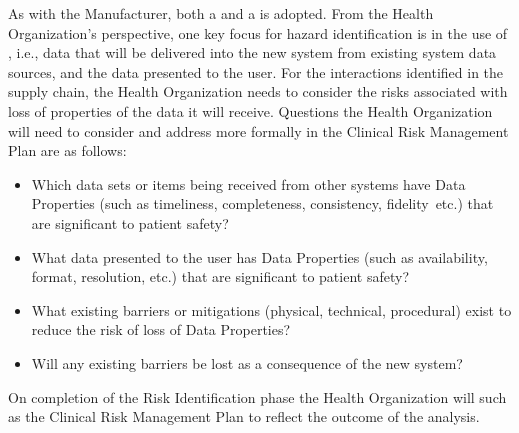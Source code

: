 As with the Manufacturer, both a  and a  is adopted. From the Health Organization's perspective, one key focus for hazard identification is in the use of , i.e., data that will be delivered into the new system from existing system data sources, and the data presented to the user. For the interactions identified in the supply chain, the Health Organization needs to consider the risks associated with loss of properties of the data it will receive. Questions the Health Organization will need to consider and address more formally in the Clinical Risk Management Plan are as follows:
\clearpage%
\begin{itemize}
  \item Which data sets or items being received from other systems have Data Properties (such as timeliness, \gls{completeness}, \gls{consistency}, \cbstart\gls{fidelity}\cbend\ etc.) that are significant to patient safety? 
  \item What data presented to the user has Data Properties (such as \gls{availability}, format, resolution, etc.) that are significant to patient safety?
  \item What existing barriers or mitigations (physical, technical, procedural) exist to reduce the risk of loss of Data Properties?
  \item
  Will any existing barriers be lost as a consequence of the new system?
\end{itemize}

On completion of the Risk Identification phase the Health Organization will  such as the Clinical Risk Management Plan to reflect the outcome of the analysis.

